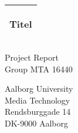 %
\begin{titlepage}
  \addtolength{\hoffset}{0.5\evensidemargin-0.5\oddsidemargin} %
  \noindent%
  \begin{tabular}{@{}p{\textwidth}@{}}
    \toprule[2pt]
    \midrule
    \vspace{0.2cm}
    \begin{center}
    \Huge{\textbf{
      Titel%
    }}
    \end{center}
    \vspace{0.2cm}\\
    \midrule
    \toprule[2pt]
  \end{tabular}
  \vspace{1 cm}

  \begin{center}  
  

    {\large
      Project Report%
    }\\
    \vspace{0.2cm}
    {\Large
      Group MTA 16440%
    }
  \end{center}
  \begin{center}
  Aalborg University\\
  Media Technology\\
  Rendsburggade 14\\
  DK-9000 Aalborg
  \end{center}
\end{titlepage}
\clearpage
